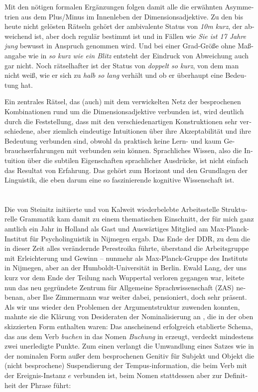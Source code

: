 \documentclass[output=paper,colorlinks,citecolor=brown]{langscibook}
\begin{document}
\begin{otherlanguage}{german}
\noindent Mit den nötigen formalen Ergänzungen folgen damit alle die erwähnten Asymmetrien aus dem Plus/Minus im Innenleben der Dimensionsadjektive. Zu den bis heute nicht gelösten Rätseln gehört der ambivalente Status von \textit{10m kurz}, der abweichend ist, aber doch regulär bestimmt ist und in Fällen wie \textit{Sie ist 17 Jahre jung} bewusst in Anspruch genommen wird. Und bei einer Grad-Größe ohne Maßangabe wie in \textit{so kurz wie ein Blitz} entsteht der Eindruck von Abweichung auch gar nicht. Noch rätselhafter ist der Status von \textit{doppelt so kurz}, von dem man nicht weiß, wie er sich zu \textit{halb so lang} verhält und ob er überhaupt eine Bedeutung hat.

Ein zentrales Rätsel, das (auch) mit dem verwickelten Netz der besprochenen Kombinationen rund um die Dimensionsadjektive verbunden ist, wird deutlich durch die Feststellung, dass mit den verschiedenartigen Konstruktionen sehr verschiedene, aber ziemlich eindeutige Intuitionen über ihre Akzeptabilität und ihre Bedeutung verbunden sind, obwohl da praktisch keine Lern- und kaum Gebrauchserfahrungen mit verbunden sein können. Sprachliches Wissen, also die Intuition über die subtilen Eigenschaften sprachlicher Ausdrücke, ist nicht einfach das Resultat von Erfahrung. Das gehört zum Horizont und den Grundlagen der Linguistik, die eben darum eine so faszinierende kognitive Wissenschaft ist.

\section{}\label{sec:5}

Die von Steinitz initiierte und von Kalweit wiederbelebte Arbeitsstelle Strukturelle Grammatik kam damit zu einem thematischen Einschnitt, der für mich ganz amtlich ein Jahr in Holland als Gast und Auswärtiges Mitglied am Max-Planck-Institut für Psycholinguistik in Nijmegen ergab. Das Ende der DDR, zu dem die in dieser Zeit alles verändernde Perestroika führte, überstand die Arbeitsgruppe mit Erleichterung und Gewinn -- nunmehr als Max-Planck-Gruppe des Instituts in Nijmegen, aber an der Humboldt-Universität in Berlin. Ewald Lang, der uns kurz vor dem Ende der Teilung nach Wuppertal verloren gegangen war, leitete nun das neu gegründete Zentrum für Allgemeine Sprachwissenschaft (ZAS) nebenan, aber Ilse Zimmermann war weiter dabei, pensioniert, doch sehr präsent. Als wir uns wieder den Problemen der Argumentstruktur zuwenden konnten, mahnte sie %
die Klärung von Desideraten der Nominalisierung an \citep{Zimmermann1991a}, die in der oben skizzierten Form enthalten waren: Das anscheinend erfolgreich etablierte Schema, das aus dem Verb \textit{buchen} in  das Nomen \textit{Buchung} in  erzeugt, verdeckt mindestens zwei unerledigte Punkte. Zum einen verlangt die Umwandlung eines Satzes wie  in der nominalen Form  außer dem besprochenen Genitiv für Subjekt und Objekt die (nicht besprochene) Suspendierung der Tempus-information, die beim Verb mit der Ereignis-Instanz $e$ verbunden ist, beim Nomen stattdessen aber zur Definitheit der Phrase führt:


\end{otherlanguage}
\end{document}
